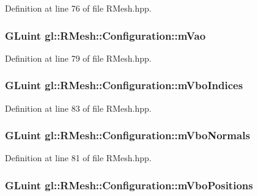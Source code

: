 Definition at line 76 of file R\-Mesh.\-hpp.

\hypertarget{classgl_1_1_r_mesh_1_1_configuration_a36cb6c53dd019a4077010f774119784f}{
\subsubsection[{m\-Vao}]{\setlength{\rightskip}{0pt plus 5cm}G\-Luint gl\-::\-R\-Mesh\-::\-Configuration\-::m\-Vao}}\label{classgl_1_1_r_mesh_1_1_configuration_a36cb6c53dd019a4077010f774119784f}


Definition at line 79 of file R\-Mesh.\-hpp.

\hypertarget{classgl_1_1_r_mesh_1_1_configuration_a31d5227781d692261eb7404a87eb691f}{
\subsubsection[{m\-Vbo\-Indices}]{\setlength{\rightskip}{0pt plus 5cm}G\-Luint gl\-::\-R\-Mesh\-::\-Configuration\-::m\-Vbo\-Indices}}\label{classgl_1_1_r_mesh_1_1_configuration_a31d5227781d692261eb7404a87eb691f}


Definition at line 83 of file R\-Mesh.\-hpp.

\hypertarget{classgl_1_1_r_mesh_1_1_configuration_a3e3e9308bee5e7c805a521e246bfbf01}{
\subsubsection[{m\-Vbo\-Normals}]{\setlength{\rightskip}{0pt plus 5cm}G\-Luint gl\-::\-R\-Mesh\-::\-Configuration\-::m\-Vbo\-Normals}}\label{classgl_1_1_r_mesh_1_1_configuration_a3e3e9308bee5e7c805a521e246bfbf01}


Definition at line 81 of file R\-Mesh.\-hpp.

\hypertarget{classgl_1_1_r_mesh_1_1_configuration_af9085868a69ebb507797023737b341a6}{
\subsubsection[{m\-Vbo\-Positions}]{\setlength{\rightskip}{0pt plus 5cm}G\-Luint gl\-::\-R\-Mesh\-::\-Configuration\-::m\-Vbo\-Positions}}\label{classgl_1_1_r_mesh_1_1_configuration_af9085868a69ebb507797023737b341a6}


